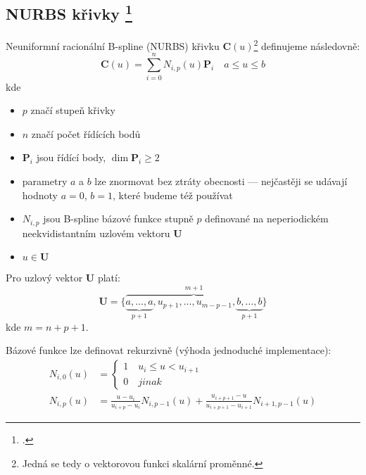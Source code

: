 \subsection[NURBS křivky]{NURBS křivky \footcite[kapitola 3.2]{The_NURBS_Book}}\label{section: NURBS křivky}
Neuniformní racionální B-spline (NURBS) křivku $\bm{C}(u)$\footnote{Jedná se tedy o vektorovou funkci skalární proměnné.} definujeme následovně:
\begin{equation}
    \bm{C}(u) = \sum_{i = 0}^{n} N_{i, p}(u)\bm{P}_i\quad a\le u \le b
\end{equation}
kde
\begin{itemize}
    \item $p$ značí stupeň křivky
    \item $n$ značí počet řídících bodů
    \item $\bm{P}_i$ jsou řídící body, $\dim{\bm{P}_i} \ge 2$
    \item parametry $a$ a $b$ lze znormovat bez ztráty obecnosti --- nejčastěji se udávají hodnoty
          $a = 0$, $b = 1$, které budeme též používat
    \item $N_{i,p}$ jsou B-spline bázové funkce stupně $p$ definované
          na neperiodickém neekvidistantním uzlovém vektoru $\bm{U}$
    \item $u \in \bm{U}$
\end{itemize}
Pro uzlový vektor $\bm{U}$ platí:
\begin{equation}
    \bm{U} = \{\overbrace{\underbrace{a, \ldots, a}_{p + 1}, u_{p + 1}, \ldots, u_{m -p - 1}, \underbrace{b, \ldots, b}_{p + 1}}^{m + 1}\}
\end{equation}
kde $m = n + p + 1$.\par
Bázové funkce lze definovat rekurzivně (výhoda jednoduché implementace):
\begin{align}
    N_{i,0}(u)  & = \begin{cases}
                        1 \quad u_i \le u < u_{i + 1} \\
                        0 \quad jinak
                    \end{cases}                \nonumber         \\
    N_{i, p}(u) & = \frac{u - u_i}{u_{i + p} - u_i}N_{i,p- 1}(u)
    + \frac{u_{i + p + 1} - u}{u_{i + p + 1} - u_{i + 1}}N_{i + 1, p - 1}(u)\label{eq:bázová funkce}
\end{align}
